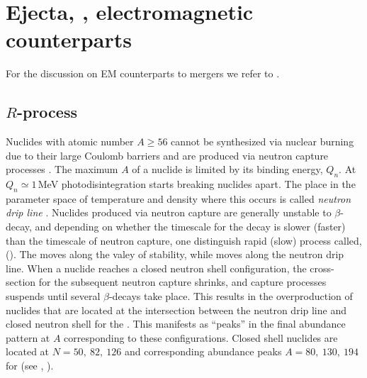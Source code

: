
\section{Ejecta, \nuc{}, electromagnetic counterparts}


For the discussion on \ac{EM} counterparts to mergers we refer to 
\citet{Kumar:2014upa,Fernandez:2015use,Metzger:2019zeh}.
%



\subsection{$R$-process \nuc{}} \label{sec:intro:nucleo}

Nuclides with atomic number  $A\geq 56$ cannot be synthesized via nuclear burning 
due to their large Coulomb barriers and are produced via 
neutron capture processes \citep{Burbidge:1957}.
The maximum $A$ of a nuclide is limited by its binding energy, $Q_n$. 
At $Q_n \simeq1 \,$MeV photodisintegration starts breaking nuclides apart. 
The place in the parameter space of temperature and density where this occurs 
is called \textit{neutron drip line} \citep{Rolfs:1988}.
Nuclides produced via neutron capture are generally unstable to $\beta$-decay,
and depending on whether the timescale for the decay is slower (faster) than 
the timescale of neutron capture, one distinguish rapid (slow) process called,
\rproc{} (\sproc{}).
%
The \sproc{} moves along the valey of stability, while \rproc{} moves along the 
neutron drip line.
%
When a nuclide reaches a closed neutron shell configuration, the cross-section 
for the subsequent neutron capture shrinks, and capture processes suspends until 
several $\beta$-decays take place. This results in the overproduction of nuclides 
that are located at the intersection between the neutron drip line and closed 
neutron shell for the \rproc{}. This manifests as ``peaks'' in the final abundance 
pattern at $A$ corresponding to these configurations.
Closed shell nuclides are located at $N=50,\: 82, \: 126$ and 
corresponding abundance peaks $A=80,\:130,\:194$ for \rproc{} 
(see \eg, \citet{Arnould:2007gh}).

